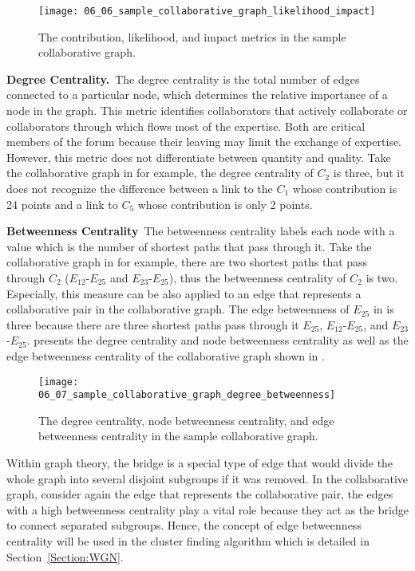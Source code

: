 \begin{figure}[!htb]
  \centering
  \texttt{[image: 06\_06\_sample\_collaborative\_graph\_likelihood\_impact]}
  \caption{The contribution, likelihood, and impact metrics in the sample collaborative graph.}
  \label{Figure:06_06}
\end{figure}

\textbf{Degree Centrality.}~The degree centrality is the total number of edges connected to a particular node, which determines the relative importance of a node in the graph. This metric identifies collaborators that actively collaborate or collaborators through which flows most of the expertise. Both are critical members of the forum because their leaving may limit the exchange of expertise. However, this metric does not differentiate between quantity and quality. Take the collaborative graph in  for example, the degree centrality of \(C_{2}\) is three, but it does not recognize the difference between a link to the \(C_{1}\) whose contribution is 24 points and a link to \(C_{5}\) whose contribution is only 2 points.

\textbf{Betweenness Centrality}~The betweenness centrality labels each node with a value which is the number of shortest paths that pass through it. Take the collaborative graph in  for example, there are two shortest paths that pass through \(C_{2}\) (\(E_{12}\)-\(E_{25}\) and \(E_{23}\)-\(E_{25}\)), thus the betweenness centrality of \(C_{2}\) is two. Especially, this measure can be also applied to an edge that represents a collaborative pair in the collaborative graph. The edge betweenness of \(E_{25}\) in  is three because there are three shortest paths pass through it \(E_{25}\), \(E_{12}\)-\(E_{25}\), and \(E_{23}\)-\(E_{25}\).  presents the degree centrality and node betweenness centrality as well as the edge betweenness centrality of the collaborative graph shown in .

\begin{figure}[!htb]
  \centering
  \texttt{[image: 06\_07\_sample\_collaborative\_graph\_degree\_betweenness]}
  \caption{The degree centrality, node betweenness centrality, and edge betweenness centrality in the sample collaborative graph.}
  \label{Figure:06_07}
\end{figure}

Within graph theory, the bridge is a special type of edge that would divide the whole graph into several disjoint subgroups if it was removed. In the collaborative graph, consider again the edge that represents the collaborative pair, the edges with a high betweenness centrality play a vital role because they act as the bridge to connect separated subgroups. Hence, the concept of edge betweenness centrality will be used in the cluster finding algorithm which is detailed in Section~\ref{Section:WGN}.

